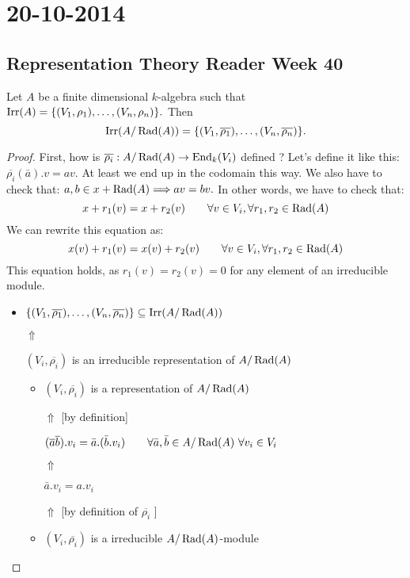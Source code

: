 \section{20-10-2014}
\subsection{Representation Theory Reader Week 40}
\begin{prop}
Let \(A\) be a finite dimensional \(k\)-algebra such that \(\operatorname{Irr}(A)=\{(V_{1},\rho _{1}),\ldots ,(V_{n},\rho _{n})\}.\) Then
\[
\operatorname{Irr}(A/\operatorname{Rad}(A))=\{(V_{1},\overline{\rho _{1}}),\ldots ,(V_{n},\overline{\rho _{n}})\}.
\]
\end{prop}

\begin{proof}
First, how is \(\overline{\rho _{i}}:A/\operatorname{Rad}(A) \rightarrow \operatorname{End}_{k}(V_{i})\) defined ? Let's define it like this: \(\overline{\rho _{i}}(\bar{a}).v=av\). At least we end up in the codomain this way. We also have to check that: \(a,b\in x+\operatorname{Rad}(A) \Longrightarrow  av=bv.\) In other words, we have to check that:
\[
x+r_{1}(v)=x+r_{2}(v) \qquad \forall v\in V_{i},\forall r_{1},r_{2}\in \operatorname{Rad}(A)
\]
We can rewrite this equation as:
\[
x(v)+r_{1}(v)=x(v)+r_{2}(v) \qquad \forall v\in V_{i},\forall r_{1},r_{2}\in \operatorname{Rad}(A)
\]
This equation holds, as \(r_{1}(v)=r_{2}(v)=0\) for any element of an irreducible module.


\begin{itemize}
  \item \(\{(V_{1},\overline{\rho _{1}}),\ldots ,(V_{n},\overline{\rho _{n}})\}\subseteq \operatorname{Irr}(A/\operatorname{Rad}(A))\)

\(\Uparrow \)

\((V_{i},\overline{\rho _{i}})\) is an irreducible representation of \(A/\operatorname{Rad}(A)\)
\begin{itemize}
  \item \((V_{i},\overline{\rho _{i}})\) is a representation of \(A/\operatorname{Rad}(A)\)

\(\Uparrow \)  [by definition]

\(
(\overline{a}\overline{b}).v_{i}=\bar{a}.(\bar{b}.v_{i}) \qquad \forall \bar{a},\bar{b}\in A/\operatorname{Rad}(A)\ \forall v_{i}\in V_{i}
\)

\(\Uparrow \)

\(\bar{a}.v_{i}=a.v_{i}\)

\(\Uparrow \) [by definition of \(\overline{\rho _{i}}\) ]
  \item \((V_{i},\overline{\rho _{i}})\) is a irreducible \(A/\operatorname{Rad}(A)\)-module


\end{itemize}
\end{itemize}
\end{proof}

